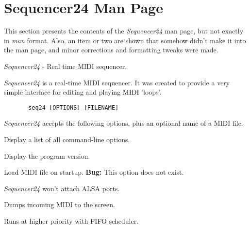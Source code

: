 %
%
%

\section{Sequencer24 Man Page}
\label{sec:seq24_man_page}

   This section presents the contents of the \textsl{Sequencer24} man page, but
   not exactly in \textsl{man} format.  Also, an item or two are shown that
   somehow didn't make it into the man page, and minor corrections and
   formatting tweaks were made.

   \textsl{Sequencer24} - Real time MIDI sequencer.

   \textsl{Sequencer24} is a real-time MIDI sequencer. It was created to provide a
   very simple interface for editing and playing MIDI 'loops'.

   \begin{verbatim}
       seq24 [OPTIONS] [FILENAME]
   \end{verbatim}

   \textsl{Sequencer24} accepts the following options, plus an optional name of a
   MIDI file.

   \setcounter{ItemCounter}{0}      %

      Display a list of all command-line options.

      Display the program version.

      Load MIDI file on startup.
      \textbf{Bug:}
      This option does not exist.

      \textsl{Sequencer24} won't attach ALSA ports.

      Dumps incoming MIDI to the screen.

      Runs at higher priority with FIFO scheduler.

